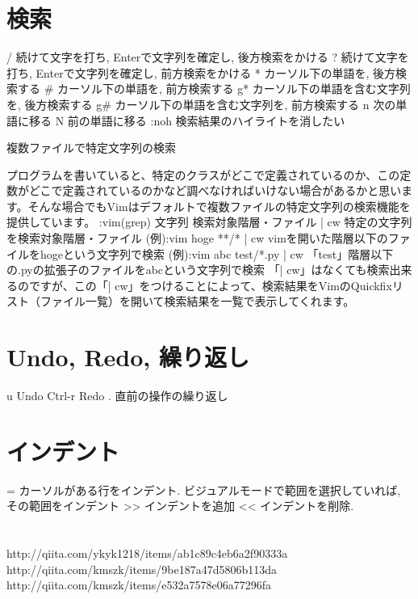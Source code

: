 \documentclass[11pt,a4paper]{jsarticle}
\begin{document}
\section{検索}
/	続けて文字を打ち, Enterで文字列を確定し, 後方検索をかける
?	続けて文字を打ち, Enterで文字列を確定し, 前方検索をかける
*	カーソル下の単語を, 後方検索する
#	カーソル下の単語を, 前方検索する
g*	カーソル下の単語を含む文字列を, 後方検索する
g#	カーソル下の単語を含む文字列を, 前方検索する
n	次の単語に移る
N	前の単語に移る
:noh  検索結果のハイライトを消したい

複数ファイルで特定文字列の検索

プログラムを書いていると、特定のクラスがどこで定義されているのか、この定数がどこで定義されているのかなど調べなければいけない場合があるかと思います。そんな場合でもVimはデフォルトで複数ファイルの特定文字列の検索機能を提供しています。
:vim(grep) 文字列 検索対象階層・ファイル | cw	特定の文字列を検索対象階層・ファイル
(例):vim hoge **/* | cw	vimを開いた階層以下のファイルをhogeという文字列で検索
(例):vim abc test/*.py | cw	「test」階層以下の.pyの拡張子のファイルをabcという文字列で検索
「| cw」はなくても検索出来るのですが、この「| cw」をつけることによって、検索結果をVimのQuickfixリスト（ファイル一覧）を開いて検索結果を一覧で表示してくれます。



\section{Undo, Redo, 繰り返し}
u	Undo
Ctrl-r	Redo
.	直前の操作の繰り返し


\section{インデント}
=	カーソルがある行をインデント. ビジュアルモードで範囲を選択していれば, その範囲をインデント
>>	インデントを追加
<<	インデントを削除.


\section{}
\section{}
\section{}
\section{}
\section{}


http://qiita.com/ykyk1218/items/ab1c89c4eb6a2f90333a
http://qiita.com/kmszk/items/9be187a47d5806b113da
http://qiita.com/kmszk/items/e532a7578e06a77296fa
\fi





%
%
\end{document}
